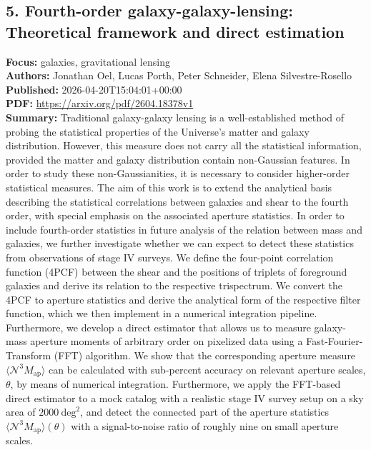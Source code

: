 \documentclass[11pt]{article}
\begin{document}
\subsection*{5. Fourth-order galaxy-galaxy-lensing: Theoretical framework and direct estimation}
\textbf{Focus:} galaxies, gravitational lensing\\
\textbf{Authors:} Jonathan Oel, Lucas Porth, Peter Schneider, Elena Silvestre-Rosello\\
\textbf{Published:} 2026-04-20T15:04:01+00:00\\
\textbf{PDF:} \href{https://arxiv.org/pdf/2604.18378v1}{https://arxiv.org/pdf/2604.18378v1}\\
\textbf{Summary:}
Traditional galaxy-galaxy lensing is a well-established method of probing the statistical properties of the Universe's matter and galaxy distribution. However, this measure does not carry all the statistical information, provided the matter and galaxy distribution contain non-Gaussian features. In order to study these non-Gaussianities, it is necessary to consider higher-order statistical measures. The aim of this work is to extend the analytical basis describing the statistical correlations between galaxies and shear to the fourth order, with special emphasis on the associated aperture statistics. In order to include fourth-order statistics in future analysis of the relation between mass and galaxies, we further investigate whether we can expect to detect these statistics from observations of stage IV surveys. We define the four-point correlation function (4PCF) between the shear and the positions of triplets of foreground galaxies and derive its relation to the respective trispectrum. We convert the 4PCF to aperture statistics and derive the analytical form of the respective filter function, which we then implement in a numerical integration pipeline. Furthermore, we develop a direct estimator that allows us to measure galaxy-mass aperture moments of arbitrary order on pixelized data using a Fast-Fourier-Transform (FFT) algorithm. We show that the corresponding aperture measure $\langle\mathcal{N}^3 M_\mathrm{ap}\rangle$ can be calculated with sub-percent accuracy on relevant aperture scales, $θ$, by means of numerical integration. Furthermore, we apply the FFT-based direct estimator to a mock catalog with a realistic stage IV survey setup on a sky area of $2000~\mathrm{deg}^2$, and detect the connected part of the aperture statistics $\langle\mathcal{N}^3 M_\mathrm{ap}\rangle(θ)$ with a signal-to-noise ratio of roughly nine on small aperture scales.
\end{document}
